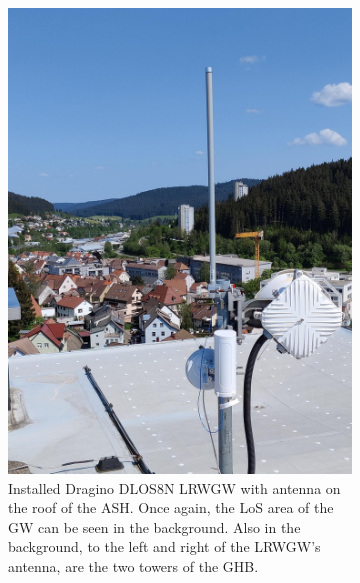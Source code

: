 \begin{figure}
    \centering
    \begin{subfigure}[t]{0.5\textwidth}
        \centering
        \includegraphics[width=1\textwidth]{pictures/hardware/gateway-deployment/gateway_ash.jpg}
        \caption{
            Installed Dragino DLOS8N \acl{LRWGW} with antenna on the roof of the \ac{ASH}.
            Once again, the \ac{LoS} area of the \acl{GW} can be seen in the background.
            Also in the background, to the left and right of the \acl{LRWGW}'s antenna, are the two towers of the \ac{GHB}.
        }\label{pic:dragino-gateway-ash}
    \end{subfigure}%
    ~
    \begin{subfigure}[t]{0.5\textwidth}
        \centering

\end{subfigure}
\end{figure}
